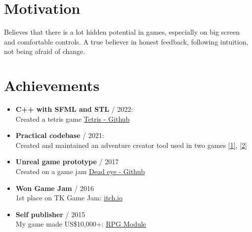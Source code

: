 \documentclass[12pt,a4paper]{article}
\begin{document}
\begin{multicols}{2}
\centering

\section*{ Motivation}
\justifying
Believes that there is a lot hidden potential in games, especially on big screen and comfortable controls. A true believer in honest feedback, following intuition, not being afraid of change.

\centering

\section*{Achievements}
\begin{itemize}[leftmargin=*]
	\setlength\itemsep{0.0cm}
	\item \textbf{C++ with SFML and STL} / 2022: \\
		Created a tetris game {\href{https://github.com/kbobnis/tetris}{Tetris - Github}}
	\item \textbf{Practical codebase} / 2021: \\
		Created and maintained an adventure creator tool used in two games {\href{https://play.google.com/store/apps/details?id=games.dali.adventure.neighborhood.unholy}{[1]}}, {\href{https://play.google.com/store/apps/details?id=games.dali.adventure.reborn}{[2]}}
	\item \textbf{Unreal game prototype} / 2017  \\
		 Created on a game jam  {\href{https://github.com/kbobnis/2017.05-TSG-Compo---Dead-eye}{Dead eye - Github}}
	\item \textbf{Won Game Jam} / 2016   \\
		1st place on TK Game Jam: {\href{https://itch.io/jam/tk-game-jam-2016/results}{itch.io}} 
	\item \textbf{Self publisher} / 2015 \\
		 My game made US\$10,000+: {\href{https://play.google.com/store/apps/details?id=com.wyspianStudios.rpgModuleFull}{RPG Module}} 
\end{itemize}



\end{multicols}
\end{document}
